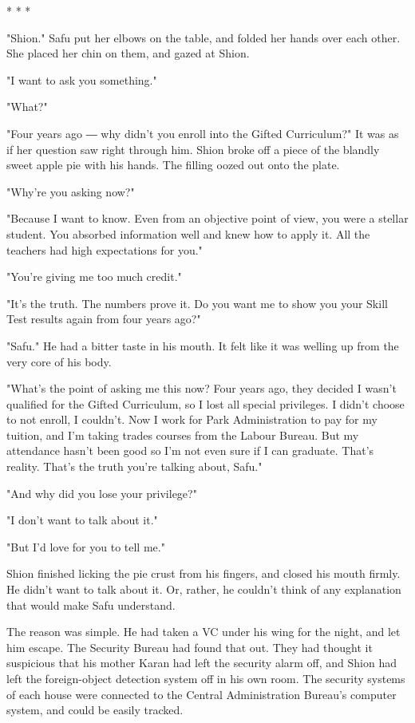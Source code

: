 * * *

"Shion." Safu put her elbows on the table, and folded her hands over
each other. She placed her chin on them, and gazed at Shion.

"I want to ask you something."

"What?"

"Four years ago ― why didn't you enroll into the Gifted Curriculum?" It
was as if her question saw right through him. Shion broke off a piece of
the blandly sweet apple pie with his hands. The filling oozed out onto
the plate.

"Why're you asking now?"

"Because I want to know. Even from an objective point of view, you were
a stellar student. You absorbed information well and knew how to apply
it. All the teachers had high expectations for you."

"You're giving me too much credit."

"It's the truth. The numbers prove it. Do you want me to show you your
Skill Test results again from four years ago?"

"Safu." He had a bitter taste in his mouth. It felt like it was welling
up from the very core of his body.

"What's the point of asking me this now? Four years ago, they decided I
wasn't qualified for the Gifted Curriculum, so I lost all special
privileges. I didn't choose to not enroll, I couldn't. Now I work for
Park Administration to pay for my tuition, and I'm taking trades courses
from the Labour Bureau. But my attendance hasn't been good so I'm not
even sure if I can graduate. That's reality. That's the truth you're
talking about, Safu."

"And why did you lose your privilege?"

"I don't want to talk about it."

"But I'd love for you to tell me."

Shion finished licking the pie crust from his fingers, and closed his
mouth firmly. He didn't want to talk about it. Or, rather, he couldn't
think of any explanation that would make Safu understand.

The reason was simple. He had taken a VC under his wing for the night,
and let him escape. The Security Bureau had found that out. They had
thought it suspicious that his mother Karan had left the security alarm
off, and Shion had left the foreign-object detection system off in his
own room. The security systems of each house were connected to the
Central Administration Bureau's computer system, and could be easily
tracked.

